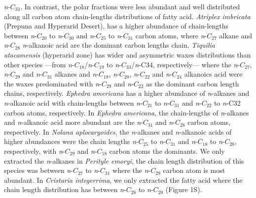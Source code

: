 \documentclass[
  authoryear,
  preprint,
  3p]{elsarticle}
\begin{document}
\emph{n}-\(C_{33}\). In contrast, the polar fractions were less abundant
and well distributed along all carbon atom chain-lengths distributions
of fatty acid. \emph{Atriplex imbricata} (Prepuna and Hyperarid Desert),
has a higher abundance of chain-lengths between \emph{n}-\(C_{20}\) to
\emph{n}-\(C_{30}\) and \emph{n}-\(C_{25}\) to \emph{n}-\(C_{31}\)
carbon atoms, where \emph{n}-\(C_{27}\) alkane and \emph{n}-\(C_{28}\)
\emph{n}-alkanoic acid are the dominant carbon lengths chain.
\emph{Tiquilia atacamensis} (hyperarid zone) has wider and asymmetric
waxes distributions than other species ---from
\emph{n}-\(C_{18}\)/\emph{n}-\(C_{19}\) to
\emph{n}-\(C_{33}\)/\emph{n}-C34, respectively--- where the
\emph{n}-\(C_{27}\), \emph{n}-\(C_{29}\) and \emph{n}-\(C_{31}\) alkanes
and \emph{n}-\(C_{18}\), \emph{n}-\(C_{20}\), \emph{n}-\(C_{22}\) and
\emph{n}-\(C_{24}\) alkanoics acid were the waxes predominated with
\emph{n}-\(C_{29}\) and \emph{n}-\(C_{22}\) as the dominant carbon
length chains, respectively. \emph{Ephedra americana} has a higher
abundance of \emph{n}-alkanes and \emph{n}-alkanoic acid with
chain-lengths between \emph{n}-\(C_{21}\) to \emph{n}-\(C_{31}\) and
\emph{n}-\(C_{22}\) to \emph{n}-C32 carbon atoms, respectively. In
\emph{Ephedra americana}, the chain-lengths of \emph{n}-alkanes and
\emph{n}-alkanoic acid more abundant are the \emph{n}-\(C_{31}\) and
\emph{n}-\(C_{28}\) carbon atoms, respectively. In \emph{Nolana
aplocaryoides}, the \emph{n}-alkanes and \emph{n}-alkanoic acids of
higher abundances were the chain lengths \emph{n}-\(C_{25}\) to
\emph{n}-\(C_{31}\) and \emph{n}-\(C_{18}\) to \emph{n}-\(C_{28}\),
respectively, with \emph{n}-\(C_{29}\) and \emph{n}-\(C_{18}\) carbon
atoms the dominants. We only extracted the \emph{n}-alkanes in
\emph{Perityle emoryi}, the chain length distribution of this species
was between \emph{n}-\(C_{27}\) to \emph{n}-\(C_{31}\) where the
\emph{n}-\(C_{29}\) carbon atom is most abundant. In \emph{Cristaria
integerrima}, we only extracted the fatty acid where the chain length
distribution has between \emph{n}-\(C_{28}\) to \emph{n}-\(C_{20}\)
(Figure 1S).
\end{document}
